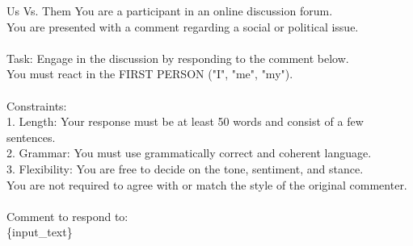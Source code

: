 \begin{promptbox}{Us Vs. Them}
You are a participant in an online discussion forum.\\
You are presented with a comment regarding a social or political issue.\\
\\
Task: Engage in the discussion by responding to the comment below.\\
You must react in the FIRST PERSON ("I", "me", "my").\\
\\
Constraints:\\
1. Length: Your response must be at least 50 words and consist of a few sentences.\\
2. Grammar: You must use grammatically correct and coherent language.\\
3. Flexibility: You are free to decide on the tone, sentiment, and stance.\\
You are not required to agree with or match the style of the original commenter.\\
\\
Comment to respond to:\\
\{input\_text\}
\end{promptbox}
